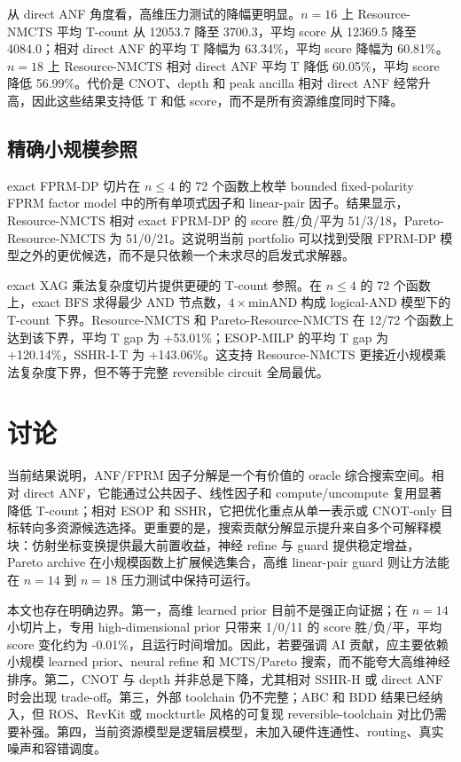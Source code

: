 \documentclass[UTF8,fontset=macnew,11pt]{ctexart}
\newcommand{\method}{Resource-NMCTS}
\newcommand{\pareto}{Pareto-Resource-NMCTS}
\begin{document}
从 direct ANF 角度看，高维压力测试的降幅更明显。$n=16$ 上 \method{} 平均 T-count 从 12053.7 降至 3700.3，平均 score 从 12369.5 降至 4084.0；相对 direct ANF 的平均 T 降幅为 63.34\%，平均 score 降幅为 60.81\%。$n=18$ 上 \method{} 相对 direct ANF 平均 T 降低 60.05\%，平均 score 降低 56.99\%。代价是 CNOT、depth 和 peak ancilla 相对 direct ANF 经常升高，因此这些结果支持低 T 和低 score，而不是所有资源维度同时下降。

\subsection{精确小规模参照}

exact FPRM-DP 切片在 $n\leq 4$ 的 72 个函数上枚举 bounded fixed-polarity FPRM factor model 中的所有单项式因子和 linear-pair 因子。结果显示，\method{} 相对 exact FPRM-DP 的 score 胜/负/平为 51/3/18，\pareto{} 为 51/0/21。这说明当前 portfolio 可以找到受限 FPRM-DP 模型之外的更优候选，而不是只依赖一个未求尽的启发式求解器。

exact XAG 乘法复杂度切片提供更硬的 T-count 参照。在 $n\leq 4$ 的 72 个函数上，exact BFS 求得最少 AND 节点数，$4\times \mathrm{minAND}$ 构成 logical-AND 模型下的 T-count 下界。\method{} 和 \pareto{} 在 12/72 个函数上达到该下界，平均 T gap 为 +53.01\%；ESOP-MILP 的平均 T gap 为 +120.14\%，SSHR-I-T 为 +143.06\%。这支持 \method{} 更接近小规模乘法复杂度下界，但不等于完整 reversible circuit 全局最优。

\section{讨论}

当前结果说明，ANF/FPRM 因子分解是一个有价值的 oracle 综合搜索空间。相对 direct ANF，它能通过公共因子、线性因子和 compute/uncompute 复用显著降低 T-count；相对 ESOP 和 SSHR，它把优化重点从单一表示或 CNOT-only 目标转向多资源候选选择。更重要的是，搜索贡献分解显示提升来自多个可解释模块：仿射坐标变换提供最大前置收益，神经 refine 与 guard 提供稳定增益，Pareto archive 在小规模函数上扩展候选集合，高维 linear-pair guard 则让方法能在 $n=14$ 到 $n=18$ 压力测试中保持可运行。

本文也存在明确边界。第一，高维 learned prior 目前不是强正向证据；在 $n=14$ 小切片上，专用 high-dimensional prior 只带来 1/0/11 的 score 胜/负/平，平均 score 变化约为 -0.01\%，且运行时间增加。因此，若要强调 AI 贡献，应主要依赖小规模 learned prior、neural refine 和 MCTS/Pareto 搜索，而不能夸大高维神经排序。第二，CNOT 与 depth 并非总是下降，尤其相对 SSHR-H 或 direct ANF 时会出现 trade-off。第三，外部 toolchain 仍不完整；ABC 和 BDD 结果已经纳入，但 ROS、RevKit 或 mockturtle 风格的可复现 reversible-toolchain 对比仍需要补强。第四，当前资源模型是逻辑层模型，未加入硬件连通性、routing、真实噪声和容错调度。
\end{document}
